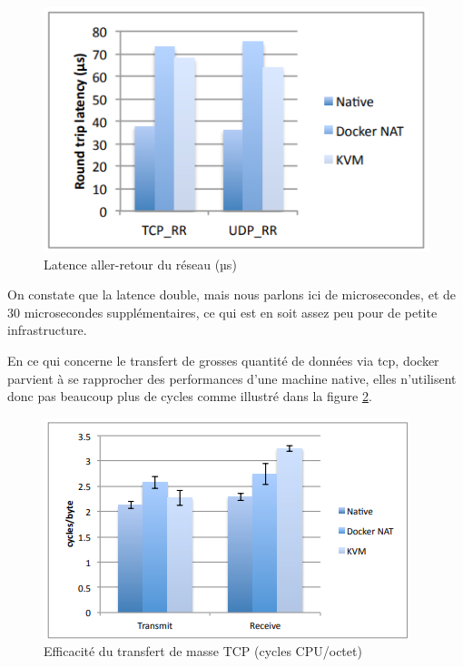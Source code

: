 \documentclass[
    iai, %
    il, %
]{heig-tb}
\begin{document}
\begin{center}
    \begin{figure}
        \includegraphics[width=\textwidth]{./assets/figures/docker-perf-latency.png}
        \caption[Docker latence aller-retour du réseau]{Latence aller-retour du réseau (µs) \cite{rad2017introduction} \label{network-latency}}
    \end{figure}
\end{center}

On constate que la latence double, mais nous parlons ici de microsecondes, et de 30 microsecondes supplémentaires, ce qui est en soit assez peu pour de petite infrastructure.

En ce qui concerne le transfert de grosses quantité de données via \gls{tcp}, docker parvient à se
rapprocher des performances d'une machine native, elles n'utilisent donc pas beaucoup plus de cycles
comme illustré dans la figure \ref{tcp-transfer-latency}.

\begin{center}
    \begin{figure}
        \includegraphics[width=\textwidth]{./assets/figures/docker-perf-transfer-efficiancy.png}
        \caption[Docker efficacité du transfert de masse]{Efficacité du transfert de masse TCP (cycles CPU/octet) \cite{rad2017introduction} \label{tcp-transfer-latency}}
    \end{figure}
\end{center}
\end{document}
